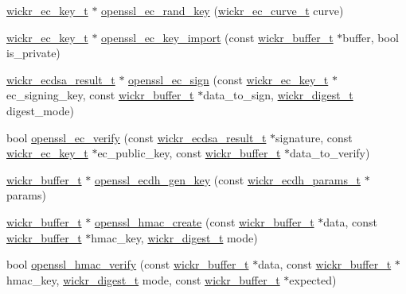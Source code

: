 \begin{DoxyCompactItemize}
\item 
\hyperlink{structwickr__ec__key}{wickr\+\_\+ec\+\_\+key\+\_\+t} $\ast$ \hyperlink{group__openssl__crypto_ga75a01a740d558bfcc0f10920266cd9d5}{openssl\+\_\+ec\+\_\+rand\+\_\+key} (\hyperlink{structwickr__ec__curve}{wickr\+\_\+ec\+\_\+curve\+\_\+t} curve)
\item 
\hyperlink{structwickr__ec__key}{wickr\+\_\+ec\+\_\+key\+\_\+t} $\ast$ \hyperlink{group__openssl__crypto_gab2cc137ada900eba89796857603cd8cd}{openssl\+\_\+ec\+\_\+key\+\_\+import} (const \hyperlink{structwickr__buffer}{wickr\+\_\+buffer\+\_\+t} $\ast$buffer, bool is\+\_\+private)
\item 
\hyperlink{structwickr__ecdsa__result}{wickr\+\_\+ecdsa\+\_\+result\+\_\+t} $\ast$ \hyperlink{group__openssl__crypto_gab32cef5c789ee1992afae98a81b65823}{openssl\+\_\+ec\+\_\+sign} (const \hyperlink{structwickr__ec__key}{wickr\+\_\+ec\+\_\+key\+\_\+t} $\ast$ec\+\_\+signing\+\_\+key, const \hyperlink{structwickr__buffer}{wickr\+\_\+buffer\+\_\+t} $\ast$data\+\_\+to\+\_\+sign, \hyperlink{structwickr__digest}{wickr\+\_\+digest\+\_\+t} digest\+\_\+mode)
\item 
bool \hyperlink{group__openssl__crypto_ga1e2b3f17c67e97360b616d0d673767f7}{openssl\+\_\+ec\+\_\+verify} (const \hyperlink{structwickr__ecdsa__result}{wickr\+\_\+ecdsa\+\_\+result\+\_\+t} $\ast$signature, const \hyperlink{structwickr__ec__key}{wickr\+\_\+ec\+\_\+key\+\_\+t} $\ast$ec\+\_\+public\+\_\+key, const \hyperlink{structwickr__buffer}{wickr\+\_\+buffer\+\_\+t} $\ast$data\+\_\+to\+\_\+verify)
\item 
\hyperlink{structwickr__buffer}{wickr\+\_\+buffer\+\_\+t} $\ast$ \hyperlink{group__openssl__crypto_gaa9e626d984efe7fed046d5f62c6c24a4}{openssl\+\_\+ecdh\+\_\+gen\+\_\+key} (const \hyperlink{structwickr__ecdh__params}{wickr\+\_\+ecdh\+\_\+params\+\_\+t} $\ast$params)
\item 
\hyperlink{structwickr__buffer}{wickr\+\_\+buffer\+\_\+t} $\ast$ \hyperlink{group__openssl__crypto_gaeb4574976214a17eb79bbc3d76f573a6}{openssl\+\_\+hmac\+\_\+create} (const \hyperlink{structwickr__buffer}{wickr\+\_\+buffer\+\_\+t} $\ast$data, const \hyperlink{structwickr__buffer}{wickr\+\_\+buffer\+\_\+t} $\ast$hmac\+\_\+key, \hyperlink{structwickr__digest}{wickr\+\_\+digest\+\_\+t} mode)
\item 
bool \hyperlink{group__openssl__crypto_gafbde176ef6f2b99ff9dab58ad69a9a74}{openssl\+\_\+hmac\+\_\+verify} (const \hyperlink{structwickr__buffer}{wickr\+\_\+buffer\+\_\+t} $\ast$data, const \hyperlink{structwickr__buffer}{wickr\+\_\+buffer\+\_\+t} $\ast$hmac\+\_\+key, \hyperlink{structwickr__digest}{wickr\+\_\+digest\+\_\+t} mode, const \hyperlink{structwickr__buffer}{wickr\+\_\+buffer\+\_\+t} $\ast$expected)

\end{DoxyCompactItemize}
